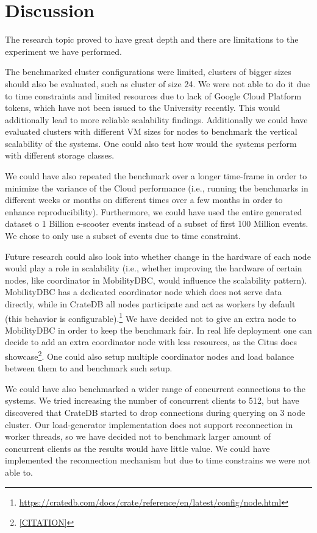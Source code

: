 \section{Discussion}
\label{cha:discussion}

The research topic proved to have great depth and there are limitations to the experiment we have performed.

The benchmarked cluster configurations were limited, clusters of bigger sizes should also be evaluated, such as cluster of size 24.
We were not able to do it due to time constraints and limited resources due to lack of Google Cloud Platform tokens, which have not been issued to the University recently.
This would additionally lead to more reliable scalability findings.
Additionally we could have evaluated clusters with different VM sizes for nodes to benchmark the vertical scalability of the systems.
One could also test how would the systems perform with different storage classes.

We could have also repeated the benchmark over a longer time-frame in order to minimize the variance of the Cloud performance
(i.e., running the benchmarks in different weeks or months on different times over a few months in order to enhance reproducibility).
Furthermore, we could have used the entire generated dataset o 1 Billion e-scooter events instead of a subset of first 100 Million events.
We chose to only use a subset of events due to time constraint.

Future research could also look into whether change in the hardware of each node would play a role in scalability 
(i.e., whether improving the hardware of certain nodes, like coordinator in MobilityDBC, would influence the scalability pattern).
MobilityDBC has a dedicated coordinator node which does not serve data directly, while in CrateDB all nodes participate and act as workers by default (this behavior is configurable).\footnote{\url{https://cratedb.com/docs/crate/reference/en/latest/config/node.html}}
We have decided not to give an extra node to MobilityDBC in order to keep the benchmark fair.
In real life deployment one can decide to add an extra coordinator node with less resources, as the Citus docs showcase\footnote{\url{[CITATION]}}.
One could also setup multiple coordinator nodes and load balance between them to and benchmark such setup.

We could have also benchmarked a wider range of concurrent connections to the systems.
We tried increasing the number of concurrent clients to 512, but have discovered that CrateDB started to drop connections during querying on 3 node cluster.
Our load-generator implementation does not support reconnection in worker threads, so we have decided not to benchmark larger amount of concurrent clients as the results would have little value.
We could have implemented the reconnection mechanism but due to time constrains we were not able to.


